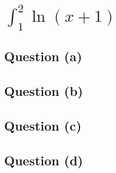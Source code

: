 \section{$\int_{1}^{2}\ln{(x+1)}$}
	\subsection{Question (a)}
	\subsection{Question (b)}
	\subsection{Question (c)}
	\subsection{Question (d)}
